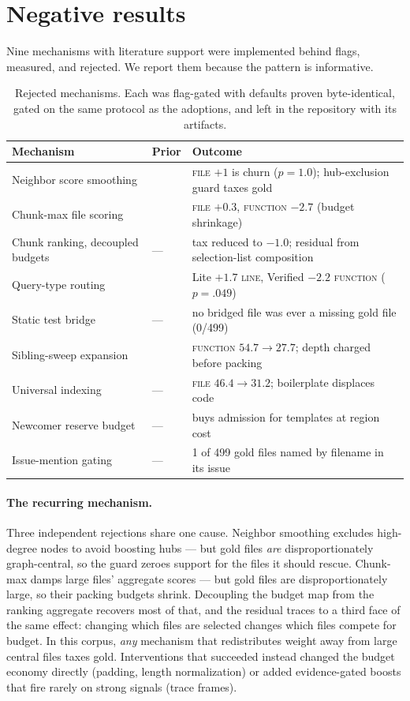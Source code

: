 \documentclass[11pt]{article}
\begin{document}
\section{Negative results}
\label{sec:negative}

Nine mechanisms with literature support were implemented behind flags,
measured, and rejected. We report them because the pattern is informative.

\begin{table}[h]
\centering
\begin{tabular}{llp{6.2cm}}
\toprule
Mechanism & Prior & Outcome \\
\midrule
Neighbor score smoothing & \cite{lexboost,gar} & \textsc{file} $+1$ is churn ($p=1.0$); hub-exclusion guard taxes gold \\
Chunk-max file scoring & \cite{brtracer,cast} & \textsc{file} $+0.3$, \textsc{function} $-2.7$ (budget shrinkage) \\
Chunk ranking, decoupled budgets & --- & tax reduced to $-1.0$; residual from selection-list composition \\
Query-type routing & \cite{blizzard,chaparro,mills} & Lite $+1.7$ \textsc{line}, Verified $-2.2$ \textsc{function} ($p=.049$) \\
Static test bridge & --- & no bridged file was ever a missing gold file (0/499) \\
Sibling-sweep expansion & \cite{hercules,sourcerercc} & \textsc{function} $54.7 \to 27.7$; depth charged before packing \\
Universal indexing & --- & \textsc{file} $46.4 \to 31.2$; boilerplate displaces code \\
Newcomer reserve budget & --- & buys admission for templates at region cost \\
Issue-mention gating & --- & 1 of 499 gold files named by filename in its issue \\
\bottomrule
\end{tabular}
\caption{Rejected mechanisms. Each was flag-gated with defaults proven
byte-identical, gated on the same protocol as the adoptions, and left in the
repository with its artifacts.}
\end{table}

\paragraph{The recurring mechanism.} Three independent rejections share one
cause. Neighbor smoothing excludes high-degree nodes to avoid boosting hubs
--- but gold files \emph{are} disproportionately graph-central, so the guard
zeroes support for the files it should rescue. Chunk-max damps large files'
aggregate scores --- but gold files are disproportionately large, so their
packing budgets shrink. Decoupling the budget map from the ranking aggregate
recovers most of that, and the residual traces to a third face of the same
effect: changing which files are selected changes which files compete for
budget. In this corpus, \emph{any} mechanism that redistributes weight away
from large central files taxes gold. Interventions that succeeded instead
changed the budget economy directly (padding, length normalization) or added
evidence-gated boosts that fire rarely on strong signals (trace frames).
\end{document}
